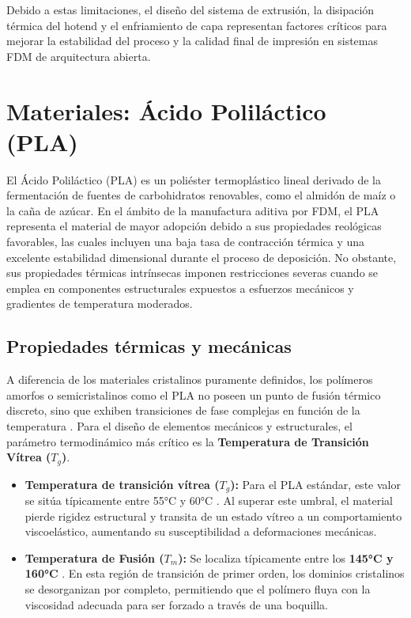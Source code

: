 Debido a estas limitaciones, el diseño del sistema de extrusión, la disipación térmica del hotend y el enfriamiento de capa representan factores críticos para mejorar la estabilidad del proceso y la calidad final de impresión en sistemas FDM de arquitectura abierta.

\section{Materiales: Ácido Poliláctico (PLA)}

El Ácido Poliláctico (PLA) es un poliéster termoplástico lineal derivado de la fermentación de fuentes de carbohidratos renovables, como el almidón de maíz o la caña de azúcar. En el ámbito de la manufactura aditiva por FDM, el PLA representa el material de mayor adopción debido a sus propiedades reológicas favorables, las cuales incluyen una baja tasa de contracción térmica y una excelente estabilidad dimensional durante el proceso de deposición. No obstante, sus propiedades térmicas intrínsecas imponen restricciones severas cuando se emplea en componentes estructurales expuestos a esfuerzos mecánicos y gradientes de temperatura moderados.



\subsection{Propiedades térmicas y mecánicas}


A diferencia de los materiales cristalinos puramente definidos, los polímeros amorfos o semicristalinos como el PLA no poseen un punto de fusión térmico discreto, sino que exhiben transiciones de fase complejas en función de la temperatura \cite[Cap.~15]{callister2020}. Para el diseño de elementos mecánicos y estructurales, el parámetro termodinámico más crítico es la \textbf{Temperatura de Transición Vítrea ($T_g$)}.

\begin{itemize}
    \item \textbf{Temperatura de transición vítrea ($T_g$):} Para el PLA estándar, este valor se sitúa típicamente entre 55°C y 60°C \cite{chanda2006}. Al superar este umbral, el material pierde rigidez estructural y transita de un estado vítreo a un comportamiento viscoelástico, aumentando su susceptibilidad a deformaciones mecánicas.
    \item \textbf{Temperatura de Fusión ($T_m$):} Se localiza típicamente entre los \textbf{145°C y 160°C} \cite{chanda2006}. En esta región de transición de primer orden, los dominios cristalinos se desorganizan por completo, permitiendo que el polímero fluya con la viscosidad adecuada para ser forzado a través de una boquilla.
\end{itemize}


